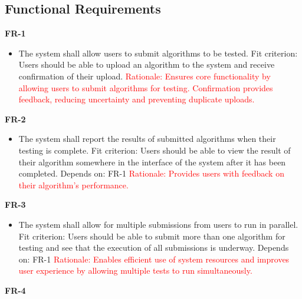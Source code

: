 \documentclass[12pt]{article}
\begin{document}
\subsection{Functional Requirements}
\textbf{FR-1}
\begin{itemize}
    \item The system shall allow users to submit algorithms to be tested. \hfill \break
    Fit criterion: Users should be able to upload an algorithm to the system and receive confirmation of their upload. \hfill \break
    \textcolor{red} {Rationale: Ensures core functionality by allowing users to submit algorithms for testing. Confirmation provides feedback, reducing uncertainty and preventing duplicate uploads.}
\end{itemize}
\textbf{FR-2}
\begin{itemize}
    \item The system shall report the results of submitted algorithms when their testing is complete. \hfill \break
    Fit criterion: Users should be able to view the result of their algorithm somewhere in the interface of the system after it has been completed.
    \break
    Depends on: FR-1
    \hfill \break
    \textcolor{red} {Rationale: Provides users with feedback on their algorithm’s performance.}
\end{itemize}
\textbf{FR-3}
\begin{itemize}
    \item The system shall allow for multiple submissions from users to run in parallel. \hfill \break
    Fit criterion: Users should be able to submit more than one algorithm for testing and see that the execution of all submissions is underway.
    \break
    Depends on: FR-1
    \hfill \break
    \textcolor{red} {Rationale: Enables efficient use of system resources and improves user experience by allowing multiple tests to run simultaneously.}
\end{itemize}
\textbf{FR-4}
\end{document}
